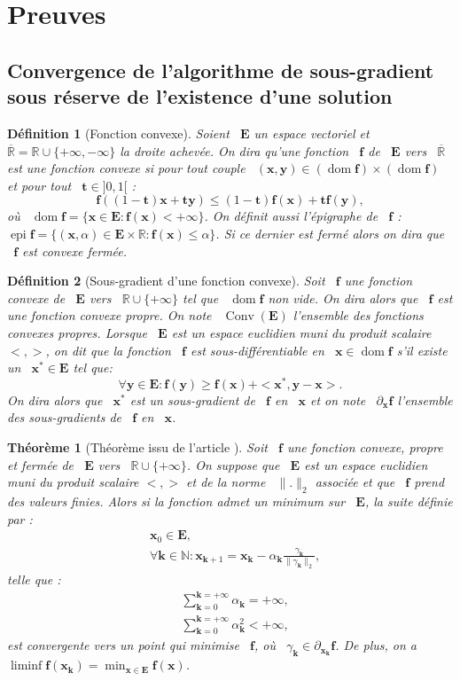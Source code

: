 \documentclass[publibook-draft]{CAp2012}
\newtheorem{definition}{Définition}
\newtheorem{theorem}{Théorème}
\newcommand{\dom}{\operatorname*{dom}}
\newcommand{\epi}{\operatorname{epi}}
\newcommand{\conv}{\operatorname*{Conv}}
\newcommand{\af}{\mathbf{f}}
\newcommand{\bk}{\mathbf{k}}
\newcommand{\bt}{\mathbf{t}}
\newcommand{\bx}{\mathbf{x}}
\newcommand{\by}{\mathbf{y}}
\newcommand{\me}{\mathbf{E}}
\begin{document}
\section{Preuves}\label{proof.sec}
\subsection{Convergence de l'algorithme de sous-gradient sous réserve de l'existence d'une solution}
\begin{definition}[Fonction convexe]
Soient ~$\me$ un espace vectoriel et ~$\overline{\mathbb{R}}=\mathbb{R}\cup\{+\infty,-\infty\}$ la droite achevée. On dira qu'une fonction ~$\af$ de ~$\me$ vers ~$\overline{\mathbb{R}}$ est une fonction convexe si pour tout couple ~$(\bx,\by)\in(\dom\af)\times(\dom\af)$ et pour tout ~$\bt\in]0,1[$ :
\begin{equation}
\af((1-\bt)\bx+\bt\by)\leq(1-\bt)\af(\bx)+\bt\af(\by),
\end{equation}
où ~$\dom\af=\{\bx\in\me:\af(\bx)<+\infty\}$.
On définit aussi l'épigraphe de ~$\af$ : ~$\epi \af=\{(\bx,\alpha)\in\me\times\mathbb{R}:\af(\bx)\leq\alpha\}$. Si ce dernier est fermé alors on dira que ~$\af$ est convexe fermée.
\end{definition}
\begin{definition}[Sous-gradient d'une fonction convexe]
Soit ~$\af$ une fonction convexe de ~$\me$ vers ~$\mathbb{R}\cup\{+\infty\}$ tel que ~$\dom\af$ non vide. On dira alors que ~$\af$ est une fonction convexe propre. On note ~$\conv(\me)$ l'ensemble des fonctions convexes propres. Lorsque ~$\me$ est un espace euclidien muni du produit scalaire $<,>$, on dit que la fonction ~$\af$ est sous-différentiable en ~$\bx\in\dom\af$ s'il existe un ~$\bx^*\in\me$ tel que:
\begin{equation}
\forall \by\in\me : \af(\by)\geq\af(\bx)+<\bx^*,\by-\bx>.
\end{equation}
On dira alors que ~$\bx^*$ est un sous-gradient de ~$\af$ en ~$\bx$ et on note ~$\partial_\bx\af$ l'ensemble des sous-gradients de ~$\af$ en ~$\bx$.
\end{definition}
\begin{theorem}[Théorème issu de l'article \cite{correa1993convergence}]\label{theoreme.sec}
Soit ~$\af$ une fonction convexe, propre et fermée de ~$\me$ vers ~$\mathbb{R}\cup\{+\infty\}$.
On suppose que ~$\me$ est un espace euclidien muni du produit scalaire $<,>$ et de la norme ~$\|.\|_2$ associée et que ~$\af$ prend des valeurs finies.
Alors si la fonction admet un minimum sur ~$\me$, la suite définie par :
\begin{align}
&\bx_0\in\me,
\\
&\forall \bk\in\mathbb{N} : \bx_{\bk+1}=\bx_\bk-\alpha_{\bk}\frac{\gamma_{\bk}}{\|\gamma_{\bk}\|_2},
\end{align}
telle que :
\begin{align}
&\sum_{\bk=0}^{\bk=+\infty}\alpha_{\bk}=+\infty,
\\
&\sum_{\bk=0}^{\bk=+\infty}\alpha_{\bk}^2<+\infty,
\end{align}
est convergente vers un point qui minimise ~$\af$, où ~$\gamma_{\bk}\in\partial_{\bx_\bk}\af$. De plus, on a ~$\liminf\af({\bx_\bk})=\min_{\bx\in\me}\af(\bx)$.
\end{theorem}
\end{document}
